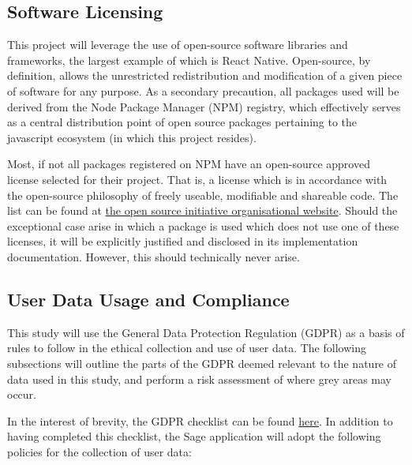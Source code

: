 \subsection{Software Licensing}
This project will leverage the use of open-source software libraries and frameworks, the largest example of which is React Native. Open-source, by definition, allows the unrestricted redistribution and modification of a given piece of software for any purpose. As a secondary precaution, all packages used will be derived from the Node Package Manager (NPM) registry, which effectively serves as a central distribution point of open source packages pertaining to the javascript ecosystem (in which this project resides).

Most, if not all packages registered on NPM have an open-source approved license selected for their project. That is, a license which is in accordance with the open-source philosophy of freely useable, modifiable and shareable code. The list can be found at \href{https://opensource.org/licenses}{the open source initiative organisational website}. Should the exceptional case arise in which a package is used which does not use one of these licenses, it will be explicitly justified and disclosed in its implementation documentation. However, this should technically never arise.

\subsection{User Data Usage and Compliance}
This study will use the General Data Protection Regulation (GDPR) as a basis of rules to follow in the ethical collection and use of user data. The following subsections will outline the parts of the GDPR deemed relevant to the nature of data used in this study, and perform a risk assessment of where grey areas may occur.

In the interest of brevity, the GDPR checklist can be found \href{https://gdpr.eu/checklist/}{here}. In addition to having completed this checklist, the Sage application will adopt the following policies for the collection of user data:

